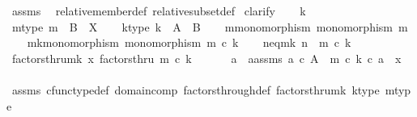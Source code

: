 \begin{isabellebody}
\isamarkupfalse%
\ assms\ \isamarkupfalse%
\ relative{\isacharunderscore}{\kern0pt}member{\isacharunderscore}{\kern0pt}def{}\ relative{\isacharunderscore}{\kern0pt}subset{\isacharunderscore}{\kern0pt}def{}\isanewline
{}\isamarkupfalse%
\ clarify\isanewline
\ \ \isamarkupfalse%
\ k\isanewline
\ \ \isamarkupfalse%
\ m{\isacharunderscore}{\kern0pt}type{\isacharcolon}{\kern0pt}\ {\isachardoublequoteopen}m\ {\isacharcolon}{\kern0pt}\ B\ {\isasymrightarrow}\ X{\isachardoublequoteclose}\isanewline
\ \ \isamarkupfalse%
\ k{\isacharunderscore}{\kern0pt}type{\isacharcolon}{\kern0pt}\ {\isachardoublequoteopen}k\ {\isacharcolon}{\kern0pt}\ A\ {\isasymrightarrow}\ B{\isachardoublequoteclose}\isanewline
\ \ \isamarkupfalse%
\ m{\isacharunderscore}{\kern0pt}monomorphism{\isacharcolon}{\kern0pt}\ {\isachardoublequoteopen}monomorphism\ m{\isachardoublequoteclose}\isanewline
\ \ \isamarkupfalse%
\ mk{\isacharunderscore}{\kern0pt}monomorphism{\isacharcolon}{\kern0pt}\ {\isachardoublequoteopen}monomorphism\ {\isacharparenleft}{\kern0pt}m\ {\isasymcirc}\isactrlsub c\ k{\isacharparenright}{\kern0pt}{\isachardoublequoteclose}\isanewline
\ \ \isamarkupfalse%
\ n{\isacharunderscore}{\kern0pt}eq{\isacharunderscore}{\kern0pt}mk{\isacharcolon}{\kern0pt}\ {\isachardoublequoteopen}n\ {\isacharequal}{\kern0pt}\ m\ {\isasymcirc}\isactrlsub c\ k{\isachardoublequoteclose}\isanewline
\ \ \isamarkupfalse%
\ factorsthru{\isacharunderscore}{\kern0pt}mk{\isacharcolon}{\kern0pt}\ {\isachardoublequoteopen}x\ factorsthru\ {\isacharparenleft}{\kern0pt}m\ {\isasymcirc}\isactrlsub c\ k{\isacharparenright}{\kern0pt}{\isachardoublequoteclose}\isanewline
\ \ \isanewline
\ \ \isamarkupfalse%
\ a\ \ a{\isacharunderscore}{\kern0pt}assms{\isacharcolon}{\kern0pt}\ {\isachardoublequoteopen}a\ {\isasymin}\isactrlsub c\ A\ {\isasymand}\ {\isacharparenleft}{\kern0pt}m\ {\isasymcirc}\isactrlsub c\ k{\isacharparenright}{\kern0pt}\ {\isasymcirc}\isactrlsub c\ a\ {\isacharequal}{\kern0pt}\ x{\isachardoublequoteclose}\isanewline
\ \ \ \ \isamarkupfalse%
\ assms{\isacharparenleft}{\kern0pt}{}{\isacharparenright}{\kern0pt}\ cfunc{\isacharunderscore}{\kern0pt}type{\isacharunderscore}{\kern0pt}def\ domain{\isacharunderscore}{\kern0pt}comp\ factors{\isacharunderscore}{\kern0pt}through{\isacharunderscore}{\kern0pt}def\ factorsthru{\isacharunderscore}{\kern0pt}mk\ k{\isacharunderscore}{\kern0pt}type\ m{\isacharunderscore}{\kern0pt}type\ \isamarkupfalse%

\end{isabellebody}

